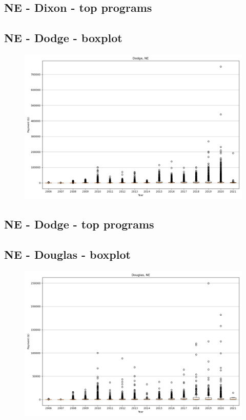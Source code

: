 \subsection*{NE - Dixon - top programs}

\newpage
\subsection*{NE - Dodge - boxplot}
\begin{figure}[h]
\centering
\includegraphics[width=7in]{../output/boxplots/counties/Dodge-NE_boxplot.png}
\end{figure}


\subsection*{NE - Dodge - top programs}

\newpage
\subsection*{NE - Douglas - boxplot}
\begin{figure}[h]
\centering
\includegraphics[width=7in]{../output/boxplots/counties/Douglas-NE_boxplot.png}
\end{figure}


